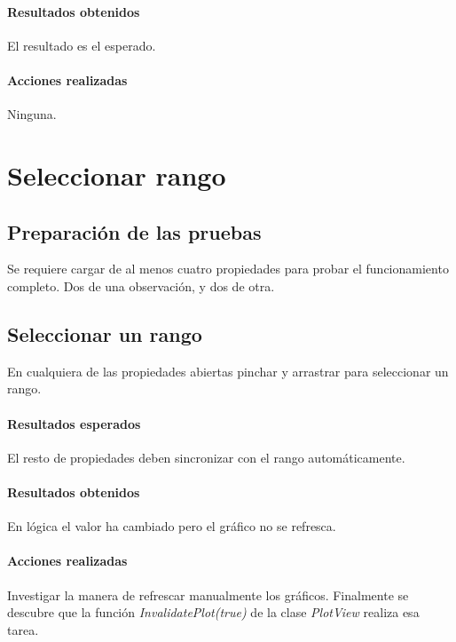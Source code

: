 \paragraph{Resultados obtenidos}
El resultado es el esperado.

\paragraph{Acciones realizadas}
Ninguna.

\section{Seleccionar rango}
\subsection{Preparaci\'on de las pruebas}
Se requiere cargar de al menos cuatro propiedades para probar el funcionamiento
completo. Dos de una observaci\'on, y dos de otra.

\subsection{Seleccionar un rango}
En cualquiera de las propiedades abiertas pinchar y arrastrar para seleccionar
un rango.

\paragraph{Resultados esperados}
El resto de propiedades deben sincronizar con el rango autom\'aticamente.

\paragraph{Resultados obtenidos}
En l\'ogica el valor ha cambiado pero el gr\'afico no se refresca.

\paragraph{Acciones realizadas}
Investigar la manera de refrescar manualmente los gr\'aficos.
Finalmente se descubre que la funci\'on \emph{InvalidatePlot(true)} de la
clase \emph{PlotView} realiza
esa tarea.